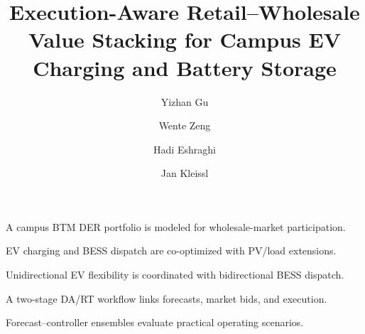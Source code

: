 \documentclass[final,5p,times]{elsarticle}
\begin{document}
\begin{frontmatter}

\title{Execution-Aware Retail--Wholesale Value Stacking for Campus EV Charging and Battery Storage}

\author[ucsd]{Yizhan Gu}
\author[totalenergies]{Wente Zeng}
\author[totalenergies]{Hadi Eshraghi}
\author[ucsd]{Jan Kleissl}



\begin{highlights}
\item A campus BTM DER portfolio is modeled for wholesale-market participation.
\item EV charging and BESS dispatch are co-optimized with PV/load extensions.
\item Unidirectional EV flexibility is coordinated with bidirectional BESS dispatch.
\item A two-stage DA/RT workflow links forecasts, market bids, and execution.
\item Forecast--controller ensembles evaluate practical operating scenarios.
\end{highlights}


\end{frontmatter}
\end{document}
